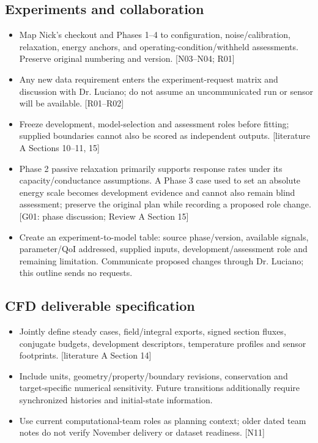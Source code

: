 \subsection{Experiments and collaboration}
\begin{itemize}[leftmargin=*]
\item Map Nick's checkout and Phases 1--4 to configuration, noise/calibration, relaxation, energy anchors, and operating-condition/withheld assessments. Preserve original numbering and version. [N03--N04; R01]
\item Any new data requirement enters the experiment-request matrix and discussion with Dr. Luciano; do not assume an uncommunicated run or sensor will be available. [R01--R02]
\item Freeze development, model-selection and assessment roles before fitting; supplied boundaries cannot also be scored as independent outputs. [literature A Sections 10--11, 15]
\item Phase 2 passive relaxation primarily supports response rates under its capacity/conductance assumptions. A Phase 3 case used to set an absolute energy scale becomes development evidence and cannot also remain blind assessment; preserve the original plan while recording a proposed role change. [G01: phase discussion; Review A Section 15]
\item Create an experiment-to-model table: source phase/version, available signals, parameter/QoI addressed, supplied inputs, development/assessment role and remaining limitation. Communicate proposed changes through Dr. Luciano; this outline sends no requests.
\end{itemize}

\subsection{CFD deliverable specification}
\begin{itemize}[leftmargin=*]
\item Jointly define steady cases, field/integral exports, signed section fluxes, conjugate budgets, development descriptors, temperature profiles and sensor footprints. [literature A Section 14]
\item Include units, geometry/property/boundary revisions, conservation and target-specific numerical sensitivity. Future transitions additionally require synchronized histories and initial-state information.
\item Use current computational-team roles as planning context; older dated team notes do not verify November delivery or dataset readiness. [N11]
\end{itemize}

